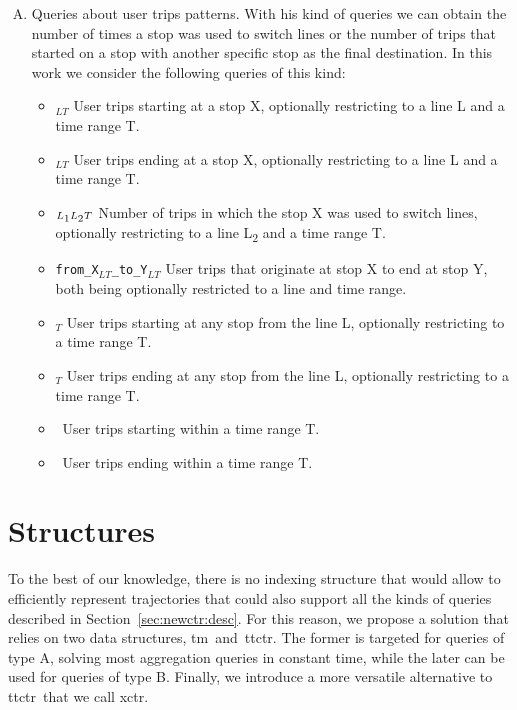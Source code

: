 \begin{enumerate}[A)]
        \item Queries about user trips patterns. With his kind of queries we can obtain the number of times a stop was used to switch lines or the number of trips that started on a stop with another specific stop as the final destination. In this work we consider the following queries of this kind:
        \begin{itemize}
            \item \startX$_{LT}$ User trips starting at a stop X, optionally restricting to a line L and a time range T.
            \item \endX$_{LT}$ User trips ending at a stop X, optionally restricting to a line L and a time range T.
            \item \switchX$_{L\textsubscript{1}L\textsubscript{2}T}$ Number of trips in which the stop X was used to switch lines, optionally restricting to a line L\textsubscript{2} and a time range T.
            \item \texttt{from\_X$_{LT}$\_to\_Y$_{LT}$} User trips that originate at stop X to end at stop Y, both being optionally restricted to a line and time range.
            \item \startL$_T$ User trips starting at any stop from the line L, optionally restricting to a time range T.
            \item \endL$_T$ User trips ending at any stop from the line L, optionally restricting to a time range T.
            \item \startT~User trips starting within a time range T.
            \item \endT~User trips ending within a time range T.
        \end{itemize}
    \end{enumerate}
	
\section{Structures}
    To the best of our knowledge, there is no indexing structure that would allow to efficiently represent trajectories that could also support all the kinds of queries described in Section~\ref{sec:newctr:desc}. For this reason, we propose a solution that relies on two data structures, \gls{tm}~and~\gls{ttctr}. The former is targeted for queries of type A, solving most aggregation queries in constant time, while the later can be used for queries of type B. Finally, we introduce a more versatile alternative to \gls{ttctr}~that we call \gls{xctr}.
    
